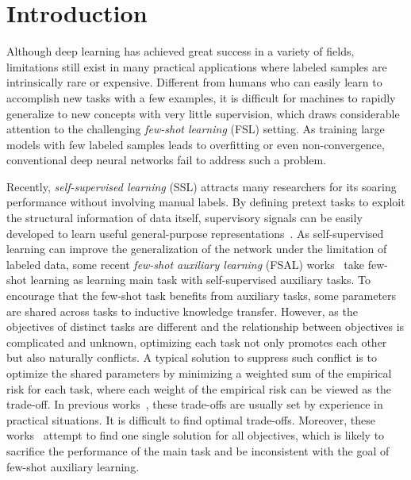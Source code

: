 \documentclass[final]{cvpr}
\begin{document}

\section{Introduction}

Although deep learning has achieved great success in a variety of fields, limitations still exist in many practical applications where labeled samples are intrinsically rare or expensive. 
Different from humans who can easily learn to accomplish new tasks with a few examples, it is difficult for machines to rapidly generalize to new concepts with very little supervision, which draws considerable attention to the challenging \textit{few-shot learning} (FSL) setting. As training large models with few labeled samples leads to overfitting or even non-convergence, conventional deep neural networks fail to address such a problem. 

Recently, \textit{self-supervised learning} (SSL) attracts many researchers for its soaring performance without involving manual labels. By defining pretext tasks to exploit the structural information of data itself, supervisory signals can be easily developed to learn useful general-purpose representations~\cite{bojanowski2017unsupervised,he2020momentum,pathak2016context}. As self-supervised learning can improve the generalization of the network under the limitation of labeled data, some recent \textit{few-shot auxiliary learning} (FSAL) works~\cite{GidarisBKPC19,SuMH20} take few-shot learning as learning main task with self-supervised auxiliary tasks. To encourage that the few-shot task benefits from auxiliary tasks, some parameters are shared across tasks to inductive knowledge transfer. However, as the objectives of distinct tasks are different and the relationship between objectives is complicated and unknown, optimizing each task not only promotes each other but also naturally conflicts. A typical solution to suppress such conflict is to optimize the shared parameters by minimizing a weighted sum of the empirical risk for each task, where each weight of the empirical risk can be viewed as the trade-off. 
In previous works~\cite{GidarisBKPC19,SuMH20}, these trade-offs are usually set by experience in practical situations.
It is difficult to find optimal trade-offs. 
Moreover,  
these works~\cite{GidarisBKPC19,SuMH20} attempt to find one single solution for all objectives, which is likely to sacrifice the performance of the main task and be inconsistent with the goal of few-shot auxiliary learning. 
\end{document}
